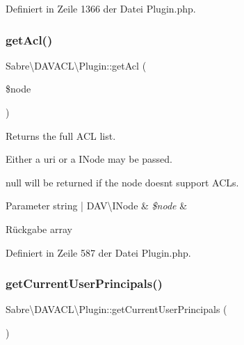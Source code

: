 Definiert in Zeile 1366 der Datei Plugin.\+php.

\mbox{\label{class_sabre_1_1_d_a_v_a_c_l_1_1_plugin_afb723560fa23e9ac6e02b599df882023}} 
\subsubsection{\texorpdfstring{get\+Acl()}{getAcl()}}
{\footnotesize\ttfamily Sabre\textbackslash{}\+D\+A\+V\+A\+C\+L\textbackslash{}\+Plugin\+::get\+Acl (\begin{DoxyParamCaption}\item[{}]{\$node }\end{DoxyParamCaption})}

Returns the full A\+CL list.

Either a uri or a I\+Node may be passed.

null will be returned if the node doesn\textquotesingle{}t support A\+C\+Ls.


\begin{DoxyParams}[1]{Parameter}
string | D\+A\+V\textbackslash{}\+I\+Node & {\em \$node} & \\
\hline
\end{DoxyParams}
\begin{DoxyReturn}{Rückgabe}
array 
\end{DoxyReturn}


Definiert in Zeile 587 der Datei Plugin.\+php.

\mbox{\label{class_sabre_1_1_d_a_v_a_c_l_1_1_plugin_a06163efd74b6638c59ed70286b1046c0}} 
\subsubsection{\texorpdfstring{get\+Current\+User\+Principals()}{getCurrentUserPrincipals()}}
{\footnotesize\ttfamily Sabre\textbackslash{}\+D\+A\+V\+A\+C\+L\textbackslash{}\+Plugin\+::get\+Current\+User\+Principals (\begin{DoxyParamCaption}{ }\end{DoxyParamCaption})}

